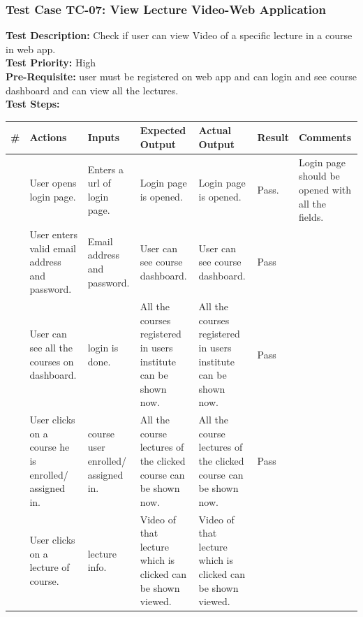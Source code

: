 \documentclass[12pt]{article}
\begin{document}
\subsubsection{Test Case TC-07: View Lecture Video-Web Application}
\textbf{Test Description: } Check if user can view Video of a specific lecture in a course in web app. \\
\textbf{Test Priority: } High \\
\textbf{Pre-Requisite: } user must be registered on web app and can login and see course dashboard and can view all the lectures. \\
\textbf{Test Steps: }
\begin{longtable}{ |>{\raggedright\arraybackslash} p{0.7cm} | >{\raggedright\arraybackslash}p{2cm}|>{\raggedright\arraybackslash} p{2cm} |>{\raggedright\arraybackslash} p{2.5cm} |>{\raggedright\arraybackslash} p{2.5cm} |>{\raggedright\arraybackslash} p{1.3cm} |>{\raggedright\arraybackslash} p{2.5cm} | } 
\hline
\textbf{\#}
& \textbf{Actions} 
& \textbf{Inputs}
& \textbf{Expected Output} 
& \textbf{Actual Output} 
& \textbf{Result} 
& \textbf{Comments} 
\\ 
\hline
1
& User opens login page. 
& Enters a url of login page.
& Login page is opened.
& Login page is opened.
& Pass.
& Login page should be opened with all the fields.
\\ 
\hline
2 
& User enters valid email address and password.
& Email address and password.
& User can see course dashboard.
& User can see course dashboard. 
& Pass
&  
\\ 
\hline
3
& User can see all the courses on dashboard.
& login is done.
& All the courses registered in users institute can be shown now.
& All the courses registered in users institute can be shown now. 
& Pass
&  
\\ 
\hline
4
& User clicks on a course he is enrolled/ assigned in.
& course user enrolled/ assigned in.
& All the course lectures of the clicked course can be shown now.
& All the course lectures of the clicked course can be shown now. 
& Pass
&  
\\ 
\hline
5
& User clicks on a lecture of course.
& lecture info.
& Video of that lecture which is clicked can be shown viewed.
& Video of that lecture which is clicked can be shown viewed. 
& 
&  
\\ 
\hline

\end{longtable}
\end{document}
